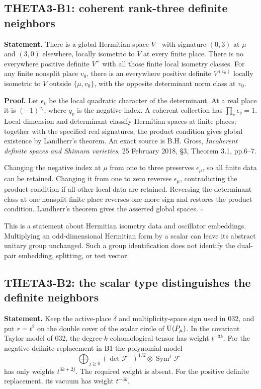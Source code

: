 \documentclass[11pt]{article}
\theoremstyle{definition}\newtheorem{definition}[theorem]{Definition}\newtheorem{remark}[theorem]{Remark}
\begin{document}
\subsection{THETA3-B1: coherent rank-three definite neighbors}\label{B1}

\textbf{Statement.} There is a global Hermitian space $V^-$ with signature $(0,3)$ at $\mu$ and $(3,0)$ elsewhere, locally isometric to $V$ at every finite place. There is no everywhere positive definite $V^+$ with all those finite local isometry classes. For any finite nonsplit place $v_0$, there is an everywhere positive definite $V^{(v_0)}$ locally isometric to $V$ outside $\{\mu,v_0\}$, with the opposite determinant norm class at $v_0$.

\textbf{Proof.} Let $\epsilon_v$ be the local quadratic character of the determinant. At a real place it is $(-1)^{q_v}$, where $q_v$ is the negative index. A coherent collection has $\prod_v\epsilon_v=1$. Local dimension and determinant classify Hermitian spaces at finite places; together with the specified real signatures, the product condition gives global existence by Landherr's theorem. An exact source is B.H. Gross, \emph{Incoherent definite spaces and Shimura varieties}, 25 February 2018, \S3, Theorem 3.1, pp.6--7.

Changing the negative index at $\mu$ from one to three preserves $\epsilon_\mu$, so all finite data can be retained. Changing it from one to zero reverses $\epsilon_\mu$, contradicting the product condition if all other local data are retained. Reversing the determinant class at one nonsplit finite place reverses one more sign and restores the product condition. Landherr's theorem gives the asserted global spaces. \hfill$\square$

This is a statement about Hermitian isometry data and oscillator embeddings. Multiplying an odd-dimensional Hermitian form by a scalar can leave its abstract unitary group unchanged. Such a group identification does not identify the dual-pair embedding, splitting, or test vector.

\subsection{THETA3-B2: the scalar type distinguishes the definite neighbors}\label{B2}

\textbf{Statement.} Keep the active-place $\delta$ and multiplicity-space sign used in 032, and put $r=t^2$ on the double cover of the scalar circle of $\operatorname{U}(P_\mu)$. In the covariant Taylor model of 032, the degree-$k$ cohomological tensor has weight $t^{-3k}$. For the negative definite replacement in B1 the polynomial model
\[
 \bigoplus_{j\geq0}(\det\mathcal F^-)^{1/2}\otimes
                    \operatorname{Sym}^j\mathcal F^-
\]
has only weights $t^{3k+2j}$. The required weight is absent. For the positive definite replacement, its vacuum has weight $t^{-3k}$.
\end{document}
